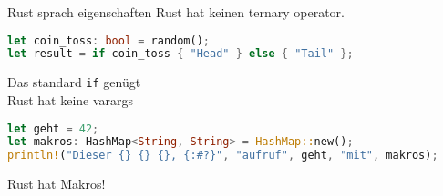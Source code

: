 \begin{frame}[fragile]{Rust sprach eigenschaften}
    Rust hat keinen ternary operator.
    \pause
    \begin{lstlisting}[language=Rust,escapechar=@,label={lst:ternary}]
let coin_toss: bool = random();
let result = if coin_toss { "Head" } else { "Tail" };\end{lstlisting}
    Das standard \texttt{if} genügt \\
    \pause
    \vspace{0.5cm}
    Rust hat keine varargs
    \pause
    \begin{lstlisting}[language=Rust,escapechar=@,label={lst:makros}]
let geht = 42;
let makros: HashMap<String, String> = HashMap::new();
println!("Dieser {} {} {}, {:#?}", "aufruf", geht, "mit", makros);\end{lstlisting}
    \pause
    Rust hat Makros!
\end{frame}

